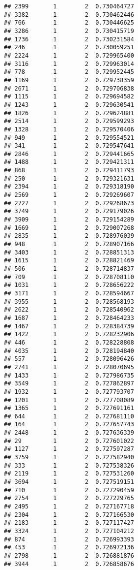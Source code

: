 \documentclass[
]{article}
\begin{document}
\begin{verbatim}
## 2399       1        2  0.730464727
## 3382       1        2  0.730462446
## 766        1        2  0.730446625
## 3286       1        2  0.730415719
## 1736       1        2  0.730231584
## 246        1        2  0.730059251
## 2224       1        2  0.729965400
## 3116       1        2  0.729963014
## 778        1        2  0.729952445
## 1169       1        2  0.729738359
## 2671       1        2  0.729706838
## 1115       1        2  0.729694582
## 1243       1        2  0.729630541
## 1826       1        2  0.729624881
## 2514       1        2  0.729599293
## 1328       1        2  0.729570406
## 949        1        2  0.729554521
## 341        1        2  0.729547641
## 2846       1        2  0.729441665
## 1488       1        2  0.729421311
## 868        1        2  0.729411793
## 250        1        2  0.729321631
## 2394       1        2  0.729318190
## 2569       1        2  0.729269607
## 2727       1        2  0.729268673
## 3749       1        2  0.729179026
## 3909       1        2  0.729154289
## 1669       1        2  0.729007268
## 2835       1        2  0.728976039
## 948        1        2  0.728907166
## 3403       1        2  0.728851313
## 1615       1        2  0.728821469
## 506        1        2  0.728714837
## 709        1        2  0.728708110
## 1031       1        2  0.728656222
## 3171       1        2  0.728594667
## 3955       1        2  0.728568193
## 2622       1        2  0.728540962
## 1687       1        2  0.728464233
## 1467       1        2  0.728384739
## 1422       1        2  0.728232906
## 446        1        2  0.728228808
## 4035       1        2  0.728194840
## 557        1        2  0.728096426
## 2741       1        2  0.728070695
## 1433       1        2  0.727986735
## 3549       1        2  0.727862897
## 1932       1        2  0.727793707
## 1201       1        2  0.727708089
## 1365       1        2  0.727691161
## 644        1        2  0.727681110
## 164        1        2  0.727657743
## 2448       1        2  0.727636339
## 29         1        2  0.727601022
## 1127       1        2  0.727597287
## 3759       1        2  0.727582940
## 333        1        2  0.727538326
## 2119       1        2  0.727531260
## 3694       1        2  0.727519151
## 710        1        2  0.727290459
## 2754       1        2  0.727229765
## 2495       1        2  0.727167718
## 2304       1        2  0.727166530
## 2183       1        2  0.727117427
## 3324       1        2  0.727104212
## 874        1        2  0.726993393
## 453        1        2  0.726972136
## 2798       1        2  0.726881876
## 3944       1        2  0.726858676

\end{verbatim}
\end{document}
